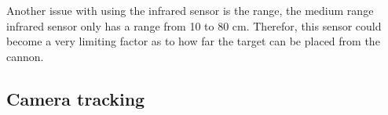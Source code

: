 Another issue with using the infrared sensor is the range, the medium range
infrared sensor only has a range from 10 to 80 cm. Therefor, this sensor could
become a very limiting factor as to how far the target can be placed from the
cannon. 

\subsection{Camera tracking}%